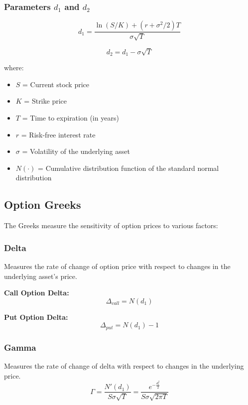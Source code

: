 \documentclass{article}
\begin{document}
\subsubsection{Parameters $d_1$ and $d_2$}
\begin{equation}
d_1 = \frac{\ln(S/K) + (r + \sigma^2/2)T}{\sigma\sqrt{T}}
\end{equation}

\begin{equation}
d_2 = d_1 - \sigma\sqrt{T}
\end{equation}

where:
\begin{itemize}
  \item $S$ = Current stock price
  \item $K$ = Strike price
  \item $T$ = Time to expiration (in years)
  \item $r$ = Risk-free interest rate
  \item $\sigma$ = Volatility of the underlying asset
  \item $N(\cdot)$ = Cumulative distribution function of the standard normal distribution
\end{itemize}

\subsection{Option Greeks}
The Greeks measure the sensitivity of option prices to various factors:

\subsubsection{Delta}
Measures the rate of change of option price with respect to changes in the underlying asset's price.

\textbf{Call Option Delta:}
\begin{equation}
\Delta_{call} = N(d_1)
\end{equation}

\textbf{Put Option Delta:}
\begin{equation}
\Delta_{put} = N(d_1) - 1
\end{equation}

\subsubsection{Gamma}
Measures the rate of change of delta with respect to changes in the underlying price.
\begin{equation}
\Gamma = \frac{N'(d_1)}{S\sigma\sqrt{T}} = \frac{e^{-\frac{d_1^2}{2}}}{S\sigma\sqrt{2\pi T}}
\end{equation}
\end{document}
